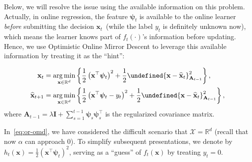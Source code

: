 \documentclass[a4paper]{article}
\numberwithin{equation}{section}
\theoremstyle{definition}
\DeclareMathOperator*{\argmin}{arg\,min}
\theoremstyle{definition}
\def \A {\mathbf{A}}
\def \I {\mathbf{I}}
\def \X {\mathcal{X}}
\def \R {\mathbb{R}}
\def \x {\textbf{x}}
\def \xh {\widehat{\x}}
\def \xh {\widehat{\x}}
\def \psib {\boldsymbol{\psi}}
\let\norm\undefined
\DeclarePairedDelimiter\norm{\lVert}{\rVert}
\begin{document}
Below, we will resolve the issue using the available information on this problem. Actually, in online regression, the feature $\psib_t$ is available to the online learner \emph{before} submitting the decision $\x_t$~(while the label $y_t$ is definitely unknown now), which means the learner knows part of $f_t(\cdot)$'s information before updating. Hence, we use Optimistic Online Mirror Descent to leverage this available information by treating it as the ``hint'':
\begin{tcolorbox}
  \begin{equation}
    \label{eq:or-omd}
    \begin{aligned}
      \x_{t} &= \argmin_{\x \in \R^d} \left\{\frac{1}{2}\left(\x^\top \psib_t\right)^2  + \frac{1}{2}\norm{\x - \xh_{t}}_{\A_{t-1}}^2\right\},\\
      \xh_{t+1} &= \argmin_{\x \in \R^d} \left\{\frac{1}{2}\left(\x^\top \psib_t - y_t\right)^2 + \frac{1}{2}\norm{\x - \xh_{t}}_{\A_{t-1}}^2\right\},
    \end{aligned}
  \end{equation}
  where $\A_{t-1} = \lambda \I + \sum_{s=1}^{t-1} \psib_s\psib_s^\top$ is the regularized covariance matrix.
\end{tcolorbox}

\setlength{\leftskip}{0.8em}
In~\eqref{eq:or-omd}, we have considered the difficult scenario that $\X = \R^d$ (recall that now $\alpha$ can approach $0$). To simplify subsequent presentations, we denote by $h_t(\x) =\frac{1}{2}\left(\x^\top \psib_t\right)^2$, serving as a ``guess'' of $f_t(\x)$ by treating $y_t = 0$.
\end{document}
